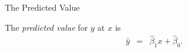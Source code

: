 \begin{frame}{The Predicted Value}

  \begin{definition}
    The \textit{predicted value} for $y$ at $x$ is
    \begin{eqnarray*}
      \hat{y} & = & \hat{\beta}_1 x + \hat{\beta}_0.
    \end{eqnarray*}
  \end{definition}




  
\end{frame}

